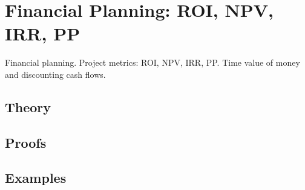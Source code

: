 
\section{Financial Planning: ROI, NPV, IRR, PP}
\label{sec:2.6.17-financial-planning}

\begin{ticket}
Financial planning. Project metrics: ROI, NPV, IRR, PP. Time value of money and discounting cash flows.
\end{ticket}

\subsection*{Theory}

\subsection*{Proofs}

\subsection*{Examples}
